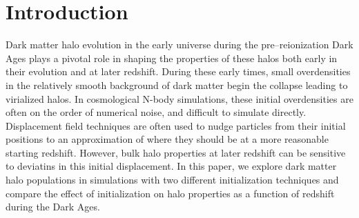 \section{Introduction}
\label{sec:introduction}

%


Dark matter halo evolution in the early universe during the pre--reionization Dark Ages plays a pivotal role in shaping the properties of these halos both early in their evolution and at later redshift.  During these early times, small overdensities in the relatively smooth background of dark matter begin the collapse leading to virialized halos.  In cosmological N-body simulations, these initial overdensities are often on the order of numerical noise, and difficult to simulate directly.  Displacement field techniques are often used to nudge particles from their initial positions to an approximation of where they should be at a more reasonable starting redshift.  However, bulk halo properties at later redshift can be sensitive to deviatins in this initial displacement.  In this paper, we explore dark matter halo populations in simulations with two different initialization techniques and compare the effect of initialization on halo properties as a function of redshift during the Dark Ages.

